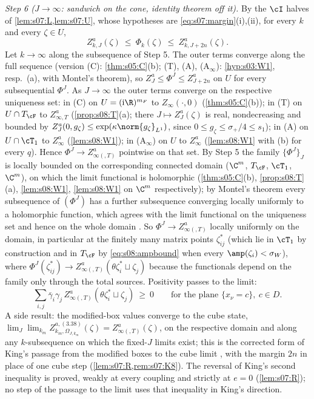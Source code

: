 \emph{Step 6 ($J\to\infty$: sandwich on the cone, identity theorem off it).} By the $\cI$ halves of \cref{lem:s07:L,lem:s07:U}, whose hypotheses are \eqref{eq:s07:margin}(i),(ii), for every $k$ and every $\zeta\in U$,
\begin{equation}\label{eq:s08:sandwich}
Z^a_{k,J}(\zeta)\ \le\ \Phi_k(\zeta)\ \le\ Z^a_{k,J+2n}(\zeta).
\end{equation}
Let $k\to\infty$ along the subsequence of Step 5. The outer terms converge along the full sequence (version (C): \cref{thm:s05:C}(b); (T), (A), (A$_\infty$): \cref{hyp:s03:W1}, resp.\ \Wtwo(a), with Montel's theorem), so $Z^a_J\le\Phi^J\le Z^a_{J+2n}$ on $U$ for every subsequential $\Phi^J$. As $J\to\infty$ the outer terms converge on the respective uniqueness set: in (C) on $U=(\mathrm i\R)^{m_F}$ to $Z_\infty(\cdot,0)$ (\cref{thm:s05:C}(b)); in (T) on $U\cap T_\cF$ to $Z^a_{\infty,T}$ (\cref{prop:s08:T}(a); there $J\mapsto Z^a_J(\zeta)$ is real, nondecreasing and bounded by $Z^a_J(0,g_\zeta)\le\exp(\kappa\norm{g_\zeta}_{L^1})$, since $0\le g_\zeta\le\sigma_+/4\le s_1$); in (A) on $U\cap\cT_1$ to $Z^a_\infty$ (\cref{lem:s08:W1}); in (A$_\infty$) on $U$ to $Z^a_\infty$ (\cref{lem:s08:W1} with \Wtwo(b) for every $q$). Hence $\Phi^J\to Z^a_{\infty(,T)}$ pointwise on that set. By Step 5 the family $\{\Phi^J\}_J$ is locally bounded on the corresponding connected domain ($\C^{m}$, $T_\cF$, $\cT_1$, $\C^m$), on which the limit functional is holomorphic (\cref{thm:s05:C}(b), \cref{prop:s08:T}(a), \cref{lem:s08:W1}, \cref{lem:s08:W1} on $\C^m$ respectively); by Montel's theorem every subsequence of $(\Phi^J)$ has a further subsequence converging locally uniformly to a holomorphic function, which agrees with the limit functional on the uniqueness set and hence on the whole domain \cite{Hor90}. So $\Phi^J\to Z^a_{\infty(,T)}$ locally uniformly on the domain, in particular at the finitely many matrix points $\zeta^*_{ij}$ (which lie in $\cT_1$ by construction and in $T_\cF$ by \eqref{eq:s08:ampbound} when every $\amp(\zeta_i)<\sigma_W$), where $\Phi^J(\zeta^*_{ij})\to Z^a_{\infty(,T)}(\theta\zeta_i^*\sqcup\zeta_j)$ because the functionals depend on the family only through the total sources. Positivity passes to the limit:
\begin{equation}\label{eq:s08:midplane}
\sum_{i,j}\bar\gamma_i\gamma_j\,Z^a_{\infty(,T)}(\theta\zeta_i^*\sqcup\zeta_j)\ \ge\ 0\qquad\text{for the plane }\{x_\nu=c\},\ c\in D .
\end{equation}
A side result: the modified-box values converge to the cube state, $\lim_J\lim_{k_m}Z^{a,(3.38)}_{k_m,\Omega_{J,k_m}}(\zeta)=Z^a_{\infty(,T)}(\zeta)$, on the respective domain and along any $k$-subsequence on which the fixed-$J$ limits exist; this is the corrected form of King's passage from the modified boxes to the cube limit \cite[(3.42)]{K2}, with the margin $2n$ in place of one cube step (\cref{lem:s07:R,rem:s07:K8}). The reversal of King's second inequality is proved, weakly at every coupling and strictly at $e=0$ (\cref{lem:s07:R}); no step of the passage to the limit uses that inequality in King's direction.

